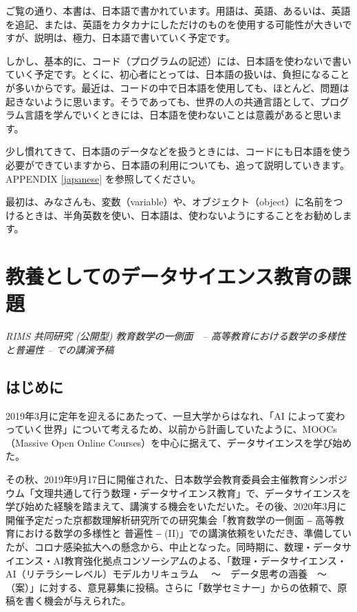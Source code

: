 \documentclass[
]{book}
\theoremstyle{definition}
\theoremstyle{definition}
\theoremstyle{definition}
\theoremstyle{definition}
\theoremstyle{remark}
\begin{document}
ご覧の通り、本書は、日本語で書かれています。用語は、英語、あるいは、英語を追記、または、英語をカタカナにしただけのものを使用する可能性が大きいですが、説明は、極力、日本語で書いていく予定です。

しかし、基本的に、コード（プログラムの記述）には、日本語を使わないで書いていく予定です。とくに、初心者にとっては、日本語の扱いは、負担になることが多いからです。最近は、コードの中で日本語を使用しても、ほとんど、問題は起きないように思います。そうであっても、世界の人の共通言語として、プログラム言語を学んでいくときには、日本語を使わないことは意義があると思います。

少し慣れてきて、日本語のデータなどを扱うときには、コードにも日本語を使う必要ができていますから、日本語の利用についても、追って説明していきます。APPENDIX \ref{japanese} を参照してください。

最初は、みなさんも、変数（variable）や、オブジェクト（object）に名前をつけるときは、半角英数を使い、日本語は、使わないようにすることをお勧めします。

\hypertarget{issues}{%
\chapter{教養としてのデータサイエンス教育の課題}\label{issues}}

\emph{RIMS 共同研究 (公開型) 教育数学の一側面　-- 高等教育における数学の多様性と普遍性 -- での講演予稿}

\hypertarget{ux306fux3058ux3081ux306b}{%
\section{はじめに}\label{ux306fux3058ux3081ux306b}}

2019年3月に定年を迎えるにあたって、一旦大学からはなれ、「AI によって変わっていく世界」について考えるため、以前から計画していたように、MOOCs（Massive Open Online Courses）を中心に据えて、データサイエンスを学び始めた。

その秋、2019年9月17日に開催された、日本数学会教育委員会主催教育シンポジウム「文理共通して行う数理・データサイエンス教育」で、データサイエンスを学び始めた経験を踏まえて、講演する機会をいただいた。その後、2020年3月に開催予定だった京都数理解析研究所での研究集会「教育数学の一側面 ‒ 高等教育における数学の多様性と 普遍性 ‒ (II)」での講演依頼をいただき、準備していたが、コロナ感染拡大への懸念から、中止となった。同時期に、数理・データサイエンス・AI教育強化拠点コンソーシアムのよる、「数理・データサイエンス・AI（リテラシーレベル）モデルカリキュラム 　～　データ思考の涵養　～（案）」に対する、意見募集に投稿。さらに「数学セミナー」からの依頼で、原稿を書く機会が与えられた。
\end{document}
